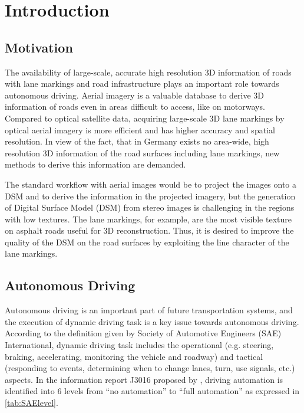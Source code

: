 
\chapter{Introduction}

\section{Motivation}
The availability of large-scale, accurate high resolution 3D information of roads with lane markings and road infrastructure plays an important role towards autonomous driving. Aerial imagery is a valuable database to derive 3D information of roads even in areas difficult to access, like on motorways. Compared to optical satellite data, acquiring large-scale 3D lane markings by optical aerial imagery is more efficient and has higher accuracy and spatial resolution. In view of the fact, that in Germany exists no area-wide, high resolution 3D information of the road surfaces including lane markings, new methods to derive this information are demanded.

The standard workflow with aerial images would be to project the images onto a DSM and to derive the information in the projected imagery, but the generation of Digital Surface Model (DSM) from stereo images is challenging in the regions with low textures. The lane markings, for example, are the most visible texture on asphalt roads useful for 3D reconstruction. Thus, it is desired to improve the quality of the DSM on the road surfaces by exploiting the line character of the lane markings. 


\section{Autonomous Driving}

Autonomous driving is an important part of future transportation systems, and the execution of dynamic driving task is a key issue towards autonomous driving. According to the definition given by Society of Automotive Engineers (SAE) International, dynamic driving task includes the operational (e.g. steering, braking, accelerating, monitoring the vehicle and roadway) and tactical (responding to events, determining when to change lanes, turn, use signals, etc.) aspects. In the information report J3016 \cite{SAE2014} proposed by \citeauthor{SAE2014}, driving automation is identified into 6 levels from “no automation” to “full automation” as expressed in \cref{tab:SAElevel}. 

